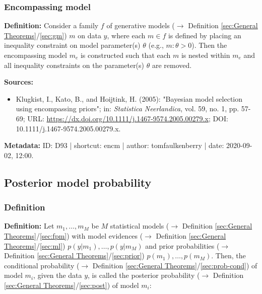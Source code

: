 \documentclass[a4paper,12pt,twoside]{book}
\begin{document}
\subsubsection[\textit{Encompassing model}]{Encompassing model} \label{sec:encm}
\setcounter{equation}{0}

\textbf{Definition:} Consider a family $f$ of generative models ($\rightarrow$ Definition \ref{sec:General Theorems}/\ref{sec:gm}) $m$ on data $y$, where each $m \in f$ is defined by placing an inequality constraint on model parameter(s) $\theta$ (e.g., $m:\theta>0$). Then the encompassing model $m_e$ is constructed such that each $m$ is nested within $m_e$ and all inequality constraints on the parameter(s) $\theta$ are removed.



\vspace{1em}
\textbf{Sources:}
\begin{itemize}
\item Klugkist, I., Kato, B., and Hoijtink, H. (2005): "Bayesian model selection using encompassing priors"; in: \textit{Statistica Neerlandica}, vol. 59, no. 1, pp. 57-69; URL: \url{https://dx.doi.org/10.1111/j.1467-9574.2005.00279.x}; DOI: 10.1111/j.1467-9574.2005.00279.x.
\end{itemize}


\vspace{1em}
\textbf{Metadata:} ID: D93 | shortcut: encm | author: tomfaulkenberry | date: 2020-09-02, 12:00.
\vspace{1em}



\subsection{Posterior model probability}

\subsubsection[\textit{Definition}]{Definition} \label{sec:pmp}
\setcounter{equation}{0}

\textbf{Definition:} Let $m_1, \ldots, m_M$ be $M$ statistical models ($\rightarrow$ Definition \ref{sec:General Theorems}/\ref{sec:fpm}) with model evidences ($\rightarrow$ Definition \ref{sec:General Theorems}/\ref{sec:ml}) $p(y \vert m_1), \ldots, p(y \vert m_M)$ and prior probabilities ($\rightarrow$ Definition \ref{sec:General Theorems}/\ref{sec:prior})  $p(m_1), \ldots, p(m_M)$. Then, the conditional probability ($\rightarrow$ Definition \ref{sec:General Theorems}/\ref{sec:prob-cond}) of model $m_i$, given the data $y$, is called the posterior probability ($\rightarrow$ Definition \ref{sec:General Theorems}/\ref{sec:post}) of model $m_i$:
\end{document}
